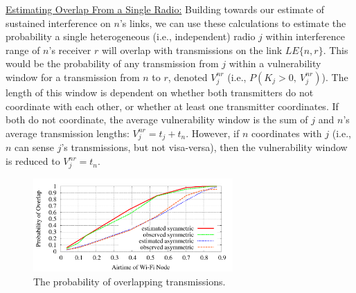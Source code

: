 \vspace{0.1in}
\noindent \uline{Estimating Overlap From a Single Radio:}  Building towards our estimate of sustained interference on $n$'s links, we can use these calculations to estimate the probability a single heterogeneous (i.e., independent) radio $j$ within interference range of $n$'s receiver $r$ will overlap with transmissions on the link $LE\{n,r\}$.  This would be the probability of any transmission from $j$ within a vulnerability window for a transmission from $n$ to $r$,  denoted $V^{nr}_j$ (i.e., $P(K_j>0,~V^{nr}_j)$).  The length of this window is dependent on whether both transmitters do not coordinate with each other, or whether at least one transmitter coordinates.  If both do not coordinate, the average vulnerability window is the sum of $j$ and $n$'s average transmission lengths: $V^{nr}_j = t_j + t_n$. However, if $n$ coordinates with $j$ (i.e., $n$ can sense $j$'s transmissions, but not visa-versa), then the vulnerability window is reduced to $V^{nr}_j = t_n$.  

\begin{figure}[t]
\centering
\includegraphics[width=3in]{figures/eo_overlaps_both}
\vspace{-0.2in}
\caption{\label{fig:overlap} \small The probability of overlapping transmissions.}
\center
\vspace{-0.1in}
\end{figure}





